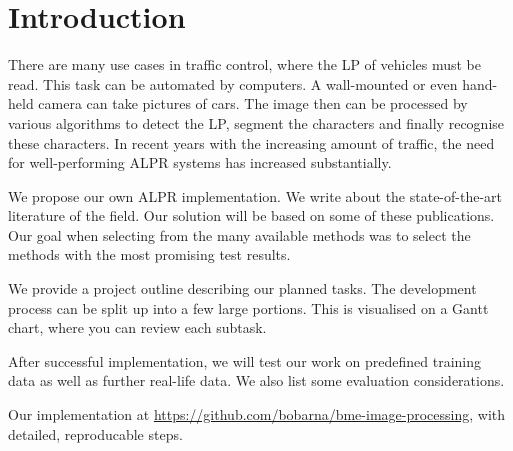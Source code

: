 \section{Introduction}

There are many use cases in traffic control, where the \ac{LP} of vehicles must
be read.  This task can be automated by computers. A wall-mounted or even
hand-held camera can take pictures of cars. The image then can be processed by
various algorithms to detect the \ac{LP}, segment the characters and finally
recognise these characters.  In recent years with the increasing amount of
traffic, the need for well-performing \ac{ALPR} systems has increased
substantially.

We propose our own \ac{ALPR} implementation.  We write about the
state-of-the-art literature of the field. Our solution will be based on some of
these publications. Our goal when selecting from the many available methods was
to select the methods with the most promising test results.

We provide a project outline describing our planned tasks. The development
process can be split up into a few large portions. This is visualised on a Gantt
chart, where you can review each subtask.

After successful implementation, we will test our work on predefined training
data as well as further real-life data. We also list some evaluation
considerations.

Our implementation at \url{https://github.com/bobarna/bme-image-processing},
with detailed, reproducable steps.

